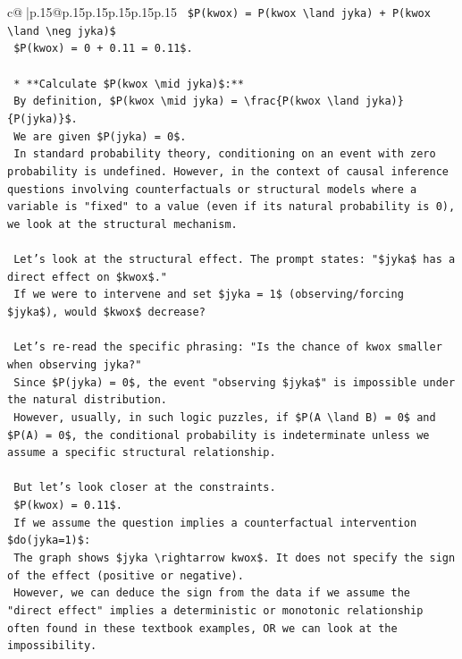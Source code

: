 \documentclass{article}
\begin{document}
{\begin{supertabular}{c@{$\;$}|p{.15\linewidth}@{}p{.15\linewidth}p{.15\linewidth}p{.15\linewidth}p{.15\linewidth}p{.15\linewidth}}
{{{\texttt{        \$P(kwox) = P(kwox \textbackslash{}land jyka) + P(kwox \textbackslash{}land \textbackslash{}neg jyka)\$} \\
\texttt{        \$P(kwox) = 0 + 0.11 = 0.11\$.} \\
\\ 
\texttt{    *   **Calculate \$P(kwox \textbackslash{}mid jyka)\$:**} \\
\texttt{        By definition, \$P(kwox \textbackslash{}mid jyka) = \textbackslash{}frac\{P(kwox \textbackslash{}land jyka)\}\{P(jyka)\}\$.} \\
\texttt{        We are given \$P(jyka) = 0\$.} \\
\texttt{        In standard probability theory, conditioning on an event with zero probability is undefined. However, in the context of causal inference questions involving counterfactuals or structural models where a variable is "fixed" to a value (even if its natural probability is 0), we look at the structural mechanism.} \\
\\ 
\texttt{        Let's look at the structural effect. The prompt states: "\$jyka\$ has a direct effect on \$kwox\$."} \\
\texttt{        If we were to intervene and set \$jyka = 1\$ (observing/forcing \$jyka\$), would \$kwox\$ decrease?} \\
\\ 
\texttt{        Let's re{-}read the specific phrasing: "Is the chance of kwox smaller when observing jyka?"} \\
\texttt{        Since \$P(jyka) = 0\$, the event "observing \$jyka\$" is impossible under the natural distribution.} \\
\texttt{        However, usually, in such logic puzzles, if \$P(A \textbackslash{}land B) = 0\$ and \$P(A) = 0\$, the conditional probability is indeterminate unless we assume a specific structural relationship.} \\
\\ 
\texttt{        But let's look closer at the constraints.} \\
\texttt{        \$P(kwox) = 0.11\$.} \\
\texttt{        If we assume the question implies a counterfactual intervention \$do(jyka=1)\$:} \\
\texttt{        The graph shows \$jyka \textbackslash{}rightarrow kwox\$. It does not specify the sign of the effect (positive or negative).} \\
\texttt{        However, we can deduce the sign from the data if we assume the "direct effect" implies a deterministic or monotonic relationship often found in these textbook examples, OR we can look at the impossibility.} \\
}}}
\end{supertabular}}
\end{document}
